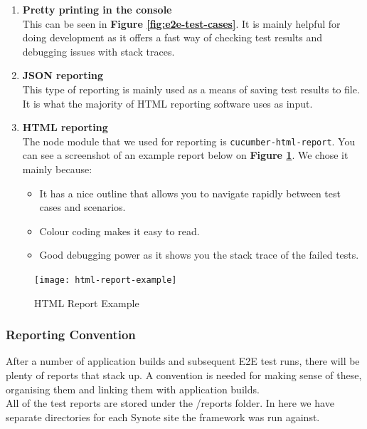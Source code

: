 \begin{enumerate}

\item \textbf{Pretty printing in the console}
\\
This can be seen in \textbf{Figure \ref{fig:e2e-test-cases}}. It is mainly helpful for doing development as it offers a fast way of checking test results and debugging issues with stack traces.

\item \textbf{JSON reporting}
\\
This type of reporting is mainly used as a means of saving test results to file. It is what the majority of HTML reporting software uses as input.

\item \textbf{HTML reporting}
\\
The node module that we used for reporting is \texttt{cucumber-html-report}. You can see a screenshot of an example report below on \textbf{Figure \ref{fig:html-report-example}}. We chose it mainly because:

\begin{itemize}
\item It has a nice outline that allows you to navigate rapidly between test cases and scenarios.
\item Colour coding makes it easy to read.
\item Good debugging power as it shows you the stack trace of the failed tests.
\end{itemize}

\end{enumerate}

\begin{figure}[!hbt]
  	\centering
 	\texttt{[image: html-report-example]}
  	\caption{HTML Report Example}
 	\label{fig:html-report-example}
\end{figure}

\subsubsection{Reporting Convention}
\label{subsubsec:reporting-convention}

After a number of application builds and subsequent E2E test runs, there will be plenty of reports that stack up. A convention is needed for making sense of these, organising them and linking them with application builds.
\\

All of the test reports are stored under the /reports folder. In here we have separate directories for each Synote site the framework was run against.
\\

